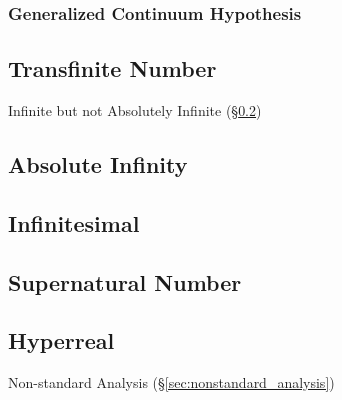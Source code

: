 \subsubsection{Generalized Continuum Hypothesis}
\label{sec:generalized_continuum}



\subsection{Transfinite Number}\label{sec:transfinite_number}

Infinite but not Absolutely Infinite (\S\ref{sec:absolute_infinity})



\subsection{Absolute Infinity}\label{sec:absolute_infinity}

\subsection{Infinitesimal}\label{sec:infinitesimal}

\subsection{Supernatural Number}\label{sec:supernatural_number}

\subsection{Hyperreal}\label{sec:hyperreal}

Non-standard Analysis (\S\ref{sec:nonstandard_analysis})



